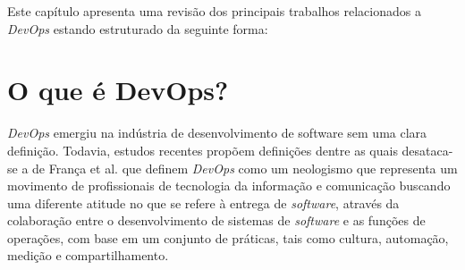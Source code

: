 \newcommand{\texCommand}[1]{\texttt{\textbackslash{#1}}}%

\newcommand{\exemplo}[1]{%
\vspace{\baselineskip}%
\noindent\fbox{\begin{minipage}{\textwidth}#1\end{minipage}}%
\\\vspace{\baselineskip}}%

\newcommand{\exemploVerbatim}[1]{%
\vspace{\baselineskip}%
\noindent\fbox{\begin{minipage}{\textwidth}%
#1\end{minipage}}%
\\\vspace{\baselineskip}}%

Este capítulo apresenta uma revisão dos principais trabalhos relacionados a
\textit{DevOps} estando estruturado da seguinte forma:

\section{O que é DevOps?}

\textit{DevOps} emergiu na indústria de desenvolvimento de software sem uma
clara definição. Todavia, estudos recentes propõem definições
dentre as quais desataca-se a de França et al. \cite{characterizing_devops}
que definem \textit{DevOps} como um neologismo que representa um movimento de
profissionais de tecnologia da informação e comunicação buscando uma
diferente atitude no que se refere à entrega de \textit{software},
através da colaboração entre o desenvolvimento de sistemas de
\textit{software} e as funções de operações, com base em um conjunto
de práticas, tais como cultura, automação, medição e compartilhamento.




